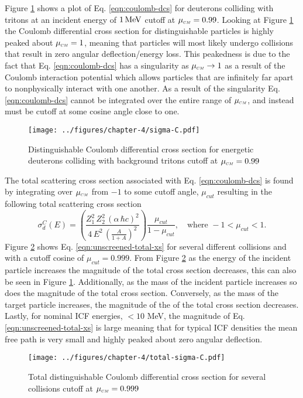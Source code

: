Figure \ref{fig:sigma_c} shows a plot of Eq. \eqref{eqn:coulomb-dcs} for deuterons colliding with tritons at an incident energy of $1 \,\text{MeV}$ cutoff at $\mucm = 0.99$. Looking at Figure \ref{fig:sigma_c} the Coulomb differential cross section for distinguishable particles is highly peaked about $\mucm = 1$, meaning that particles will most likely undergo collisions that result in zero angular deflection/energy loss. This peakedness is due to the fact that Eq. \eqref{eqn:coulomb-dcs} has a singularity as $\mucm \rightarrow 1$ as a result of the Coulomb interaction potential which allows particles that are infinitely far apart to nonphysically interact with one another. As a result of the singularity Eq. \eqref{eqn:coulomb-dcs} cannot be integrated over the entire range of $\mucm$, and instead must be cutoff at some cosine angle close to one. 
\begin{figure}[!htb]
    \centering
    \texttt{[image: ../figures/chapter-4/sigma-C.pdf]}
    \caption{Distinguishable Coulomb differential cross section for energetic deuterons colliding with background tritons cutoff at $\mucm = 0.99$}
    \label{fig:sigma_c}
\end{figure}

The total scattering cross section associated with Eq. \eqref{eqn:coulomb-dcs} is found by integrating over $\mucm$ from $-1$ to some cutoff angle, $\mu_{cut}$ resulting in the following total scattering cross section
\begin{equation} \label{eqn:unscreened-total-xs}
    \sigma^C_d(E) = \left(\dfrac{Z_1^2 \, Z_2^2 \, \left(\alpha \, \hbar c\right)^2}{ 4 \, E^2 \, \left(\frac{A}{1 + A} \right)^2}\right) \dfrac{\mu_{cut}}{1-\mu_{cut}}, \quad \text{where} \,\, -1 < \mu_{cut} < 1.
\end{equation}
Figure \ref{fig:sigma_c_total} shows Eq. \eqref{eqn:unscreened-total-xs} for several different collisions and with a cutoff cosine of $\mu_{cut} = 0.999$. From Figure \ref{fig:sigma_c_total} as the energy of the incident particle increases the magnitude of the total cross section decreases, this can also be seen in Figure \ref{fig:sigma_c}. Additionally, as the mass of the incident particle increases so does the magnitude of the total cross section. Conversely, as the mass of the target particle increases, the magnitude of the of the total cross section decreases. Lastly, for nominal ICF energies, $<10$ MeV, the magnitude of Eq. \eqref{eqn:unscreened-total-xs} is large meaning that for typical ICF densities the mean free path is very small and highly peaked about zero angular deflection.
\begin{figure}[!htb]
    \centering
    \texttt{[image: ../figures/chapter-4/total-sigma-C.pdf]}
    \caption{Total distinguishable Coulomb differential cross section for several collisions cutoff at $\mucm = 0.999$}
    \label{fig:sigma_c_total}
\end{figure}


